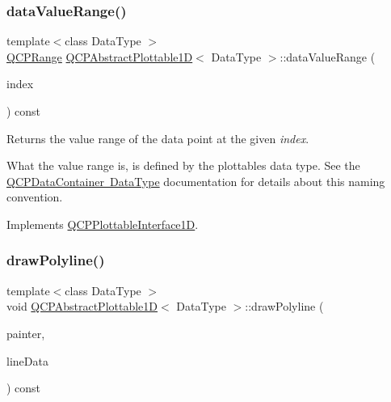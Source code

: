 \subsubsection{\texorpdfstring{data\+Value\+Range()}{dataValueRange()}}
{\footnotesize\ttfamily template$<$class Data\+Type $>$ \\
\mbox{\hyperlink{class_q_c_p_range}{Q\+C\+P\+Range}} \mbox{\hyperlink{class_q_c_p_abstract_plottable1_d}{Q\+C\+P\+Abstract\+Plottable1D}}$<$ Data\+Type $>$\+::data\+Value\+Range (\begin{DoxyParamCaption}\item[{int}]{index }\end{DoxyParamCaption}) const\hspace{0.3cm}{\ttfamily [virtual]}}





Returns the value range of the data point at the given {\itshape index}.

What the value range is, is defined by the plottable\textquotesingle{}s data type. See the \mbox{\hyperlink{class_q_c_p_data_container_qcpdatacontainer-datatype}{Q\+C\+P\+Data\+Container Data\+Type}} documentation for details about this naming convention. 

Implements \mbox{\hyperlink{class_q_c_p_plottable_interface1_d_a9ca7fcf14d885a200879768679b19be9}{Q\+C\+P\+Plottable\+Interface1D}}.

\mbox{\label{class_q_c_p_abstract_plottable1_d_a7adc6c3cccebb5341f11e0c2b7d54206}} 
\subsubsection{\texorpdfstring{draw\+Polyline()}{drawPolyline()}}
{\footnotesize\ttfamily template$<$class Data\+Type $>$ \\
void \mbox{\hyperlink{class_q_c_p_abstract_plottable1_d}{Q\+C\+P\+Abstract\+Plottable1D}}$<$ Data\+Type $>$\+::draw\+Polyline (\begin{DoxyParamCaption}\item[{\mbox{\hyperlink{class_q_c_p_painter}{Q\+C\+P\+Painter}} $\ast$}]{painter,  }\item[{const Q\+Vector$<$ Q\+PointF $>$ \&}]{line\+Data }\end{DoxyParamCaption}) const\hspace{0.3cm}{\ttfamily [protected]}}

